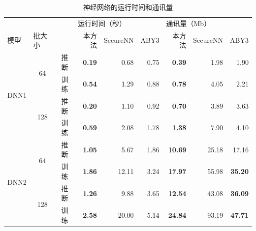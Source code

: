 \begin{table}[h!]
\caption{神经网络的运行时间和通讯量}
\label{tab:ss-perm:dnn}
\renewcommand{\arraystretch}{0.8}
\centering
\begin{tabular}{@{}cccrrrrrr@{}}
    \toprule
    \multicolumn{1}{l}{}  & \multicolumn{1}{l}{} &    & \multicolumn{2}{l}{运行时间（秒）} &      & \multicolumn{2}{l}{通讯量（Mb）} &       \\ \cmidrule(lr){4-6}\cmidrule(lr){7-9}
    \multicolumn{1}{l}{模型} & \multicolumn{1}{l}{批大小} &    & 本方法           & SecureNN & \phantom{12}ABY3 & 本方法            & SecureNN & \phantom{12}ABY3           \\ \cmidrule(lr){1-3}\cmidrule(lr){4-6}\cmidrule(lr){7-9}
    \multirow{4}{*}{DNN1} & \multirow{2}{*}{64}  & 推断 & \textbf{0.19}     & 0.68    & 0.75 & \textbf{0.39}     & 1.98    & 1.90  \\ \cmidrule(l){3-3}\cmidrule(lr){4-6}\cmidrule(lr){7-9}
                            &                         & 训练 & \textbf{0.54} & 1.29     & 0.88 & \textbf{0.78}  & 4.05     & 2.21           \\ \cmidrule(l){2-3}\cmidrule(lr){4-6}\cmidrule(lr){7-9}
                            & \multirow{2}{*}{128}    & 推断 & \textbf{0.20} & 1.10     & 0.92 & \textbf{0.70}  & 3.89     & 3.63           \\ \cmidrule(l){3-3}\cmidrule(lr){4-6}\cmidrule(lr){7-9}
                            &                         & 训练 & \textbf{0.59} & 2.08     & 1.78 & \textbf{1.38}  & 7.90     & 4.10           \\ \midrule
    \multirow{4}{*}{DNN2} & \multirow{2}{*}{64}  & 推断 & \textbf{1.05}     & 5.67    & 1.86 & \textbf{10.69}    & 25.18   & 17.16 \\ \cmidrule(l){3-3}\cmidrule(lr){4-6}\cmidrule(lr){7-9}
                            &                         & 训练 & \textbf{1.86} & 12.11    & 3.24 & \textbf{17.97} & 55.98    & \textbf{35.20} \\ \cmidrule(l){2-3}\cmidrule(lr){4-6}\cmidrule(lr){7-9}
                            & \multirow{2}{*}{128}    & 推断 & \textbf{1.26} & 9.88     & 3.65 & \textbf{12.54} & 43.08    & \textbf{36.09} \\ \cmidrule(l){3-3}\cmidrule(lr){4-6}\cmidrule(lr){7-9}
                            &                         & 训练 & \textbf{2.58} & 20.00    & 5.14 & \textbf{24.84} & 93.19    & \textbf{47.71} \\ \bottomrule
\end{tabular}
\end{table}


